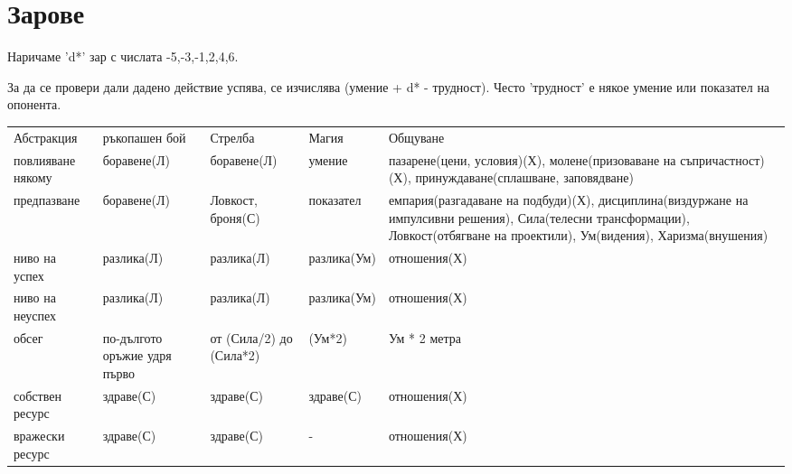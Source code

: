 \chapter{Зарове}

Наричаме 'd*' зар с числата {-5,-3,-1,2,4,6}.

За да се провери дали дадено действие успява, се изчислява (умение + d* - трудност).
Често 'трудност' е някое умение или показател на опонента.

\begin{tabular}{ p{2cm} | p{2cm} |  p{2cm} | p{2cm} | p{6cm} }
Абстракция        & ръкопашен бой                & Стрелба                 & Магия       & Общуване      \\
повлияване някому & боравене(Л)                  & боравене(Л)             & умение      & пазарене(цени, условия)(Х), молене(призоваване на съпричастност)(Х), принуждаване(сплашване, заповядване)  \\
предпазване       & боравене(Л)                  & Ловкост, броня(С)       & показател   & емпария(разгадаване на подбуди)(Х), дисциплина(виздуржане на импулсивни решения), Сила(телесни трансформации), Ловкост(отбягване на проектили), Ум(видения), Харизма(внушения)  \\
ниво на успех     & разлика(Л)                   & разлика(Л)              & разлика(Ум) & отношения(Х)  \\
ниво на неуспех   & разлика(Л)                   & разлика(Л)              & разлика(Ум) & отношения(Х)  \\
обсег             & по-дългото оръжие удря първо & от (Сила/2) до (Сила*2) & (Ум*2)      & Ум * 2 метра  \\
собствен ресурс   & здраве(С)                    & здраве(С)               & здраве(С)   & отношения(Х)  \\
вражески ресурс   & здраве(С)                    & здраве(С)               & -           & отношения(Х)  \\
\end{tabular}
